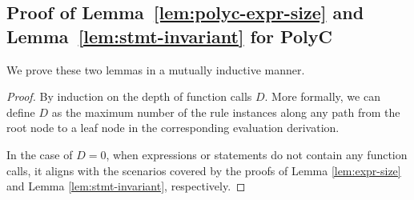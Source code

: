 \documentclass[runningheads]{llncs}
\begin{document}
\subsection{Proof of Lemma~\ref{lem:polyc-expr-size} and Lemma~\ref{lem:stmt-invariant} for PolyC}
\label{app:proof_polyc_size}
We prove these two lemmas in a mutually inductive manner.
\begin{proof}
By induction on the depth of function calls ${D}$.
More formally, we can define $D$ as the maximum number of the  rule instances along any path from the root node to a leaf node in the corresponding evaluation derivation.

In the case of $D=0$, when expressions or statements do not contain any function calls, it aligns with the scenarios covered by the proofs of Lemma \ref{lem:expr-size} and Lemma \ref{lem:stmt-invariant}, respectively.


\end{proof}
\end{document}

